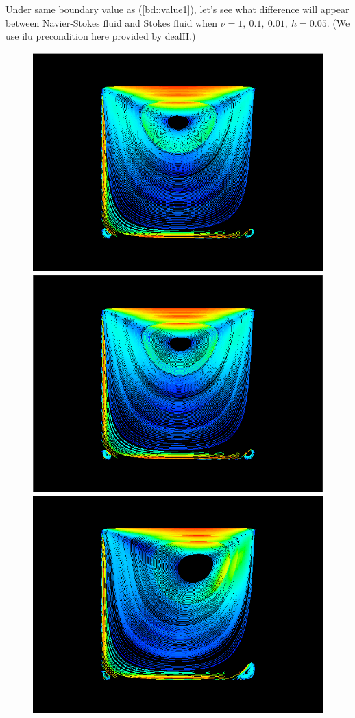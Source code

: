 \documentclass[a4paper]{article}
\begin{document}
\indent Under same boundary value as (\ref{bd::value1}), let's see what difference will appear between Navier-Stokes fluid and Stokes fluid when $\nu=1,\ 0.1,\ 0.01,\ h=0.05$. (We use ilu precondition here provided by dealII.)
\begin{figure}[h]
\centering
\includegraphics[scale = 0.2]{images/a.png}
\includegraphics[scale = 0.2]{images/b.png}
\includegraphics[scale = 0.2]{images/c.png}

\end{figure}
\end{document}
